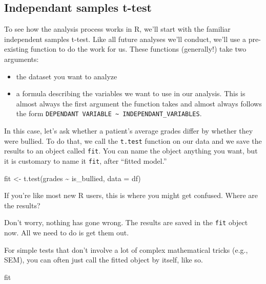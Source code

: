\documentclass[
]{book}
\newenvironment{Shaded}{\begin{snugshade}}{\end{snugshade}}
\newcommand{\AttributeTok}[1]{\textcolor[rgb]{0.77,0.63,0.00}{#1}}
\newcommand{\FunctionTok}[1]{\textcolor[rgb]{0.00,0.00,0.00}{#1}}
\newcommand{\NormalTok}[1]{#1}
\newcommand{\OtherTok}[1]{\textcolor[rgb]{0.56,0.35,0.01}{#1}}
\newcommand{\SpecialCharTok}[1]{\textcolor[rgb]{0.00,0.00,0.00}{#1}}
\providecommand{\tightlist}{%
  \setlength{\itemsep}{0pt}\setlength{\parskip}{0pt}}
\begin{document}
\hypertarget{independant-samples-t-test}{%
\subsection{Independant samples t-test}\label{independant-samples-t-test}}

To see how the analysis process works in R, we'll start with the familiar independent samples t-test. Like all future analyses we'll conduct, we'll use a pre-existing function to do the work for us. These functions (generally!) take two arguments:

\begin{itemize}
\tightlist
\item
  the dataset you want to analyze
\item
  a formula describing the variables we want to use in our analysis. This is almost always the first argument the function takes and almost always follows the form \texttt{DEPENDANT\ VARIABLE\ \textasciitilde{}\ INDEPENDANT\_VARIABLES}.
\end{itemize}

In this case, let's ask whether a patient's average grades differ by whether they were bullied. To do that, we call the \texttt{t.test} function on our data and we save the results to an object called \texttt{fit}. You can name the object anything you want, but it is customary to name it \texttt{fit}, after ``fitted model.''

\begin{Shaded}
\begin{Highlighting}[]
\NormalTok{fit }\OtherTok{\textless{}{-}} \FunctionTok{t.test}\NormalTok{(grades }\SpecialCharTok{\textasciitilde{}}\NormalTok{ is\_bullied, }\AttributeTok{data =}\NormalTok{ df)}
\end{Highlighting}
\end{Shaded}

If you're like most new R users, this is where you might get confused. Where are the results?

Don't worry, nothing has gone wrong. The results are saved in the \texttt{fit} object now. All we need to do is get them out.

For simple tests that don't involve a lot of complex mathematical tricks (e.g., SEM), you can often just call the fitted object by itself, like so.

\begin{Shaded}
\begin{Highlighting}[]
\NormalTok{fit}
\end{Highlighting}
\end{Shaded}
\end{document}
